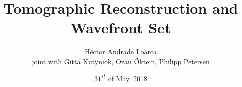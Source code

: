 \title[Tomographic Reconstruction and Wavefront Set]{Tomographic Reconstruction and Wavefront Set}
\author{H\'ector Andrade Loarca\\
				\scriptsize{joint with Gitta Kutyniok, Ozan \"Oktem, Philipp Petersen}}
\date{$31^{st}$ of May, 2018}


\newcommand{\mylogo}{\texttt{[image: ./Images/AFG.pdf]}}

\begin{frame}[plain]
	\titlepage
\end{frame}

